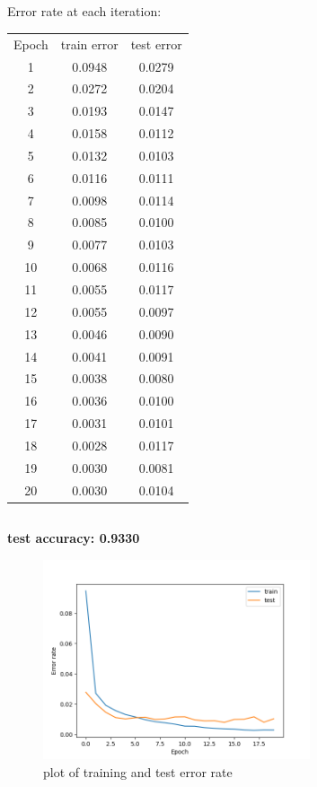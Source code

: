 \documentclass{article}
\begin{document}
\subsection{}
Error rate at each iteration:
\begin{tabular}{c c c}
Epoch & train error & test error \\
1  & 0.0948 & 0.0279 \\
2  & 0.0272 & 0.0204 \\
3  & 0.0193 & 0.0147 \\
4  & 0.0158 & 0.0112 \\
5  & 0.0132 & 0.0103 \\
6  & 0.0116 & 0.0111 \\
7  & 0.0098 & 0.0114 \\
8  & 0.0085 & 0.0100 \\
9  & 0.0077 & 0.0103 \\
10 & 0.0068 & 0.0116 \\
11 & 0.0055 & 0.0117 \\
12 & 0.0055 & 0.0097 \\
13 & 0.0046 & 0.0090 \\
14 & 0.0041 & 0.0091 \\
15 & 0.0038 & 0.0080 \\
16 & 0.0036 & 0.0100 \\
17 & 0.0031 & 0.0101 \\
18 & 0.0028 & 0.0117 \\
19 & 0.0030 & 0.0081 \\
20 & 0.0030 & 0.0104 \\
\end{tabular}


\subsection{}
\textbf{test accuracy: 0.9330}
\begin{figure}[htbp]
  \centering
  \includegraphics[width=0.7\textwidth]{error_plot.png} 
  \caption{plot of training and test error rate}
  \label{fig:example}
\end{figure}
\end{document}

